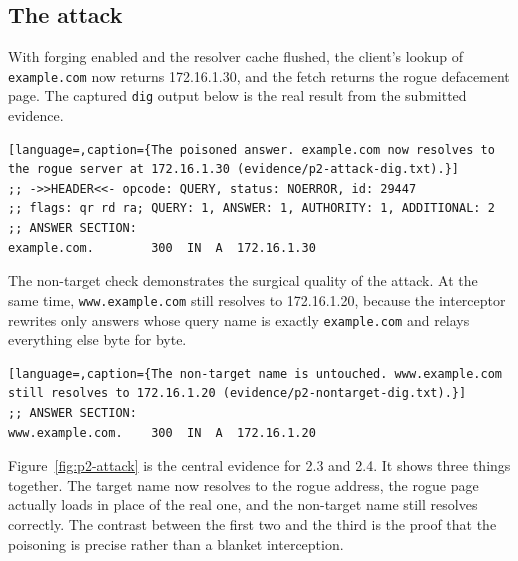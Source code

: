 \documentclass[11pt]{article}
\begin{document}
\subsection{The attack}

With forging enabled and the resolver cache flushed, the client's lookup of
\texttt{example.com} now returns 172.16.1.30, and the fetch returns the rogue
defacement page. The captured \texttt{dig} output below is the real result from
the submitted evidence.

\begin{lstlisting}[language=,caption={The poisoned answer. example.com now resolves to the rogue server at 172.16.1.30 (evidence/p2-attack-dig.txt).}]
;; ->>HEADER<<- opcode: QUERY, status: NOERROR, id: 29447
;; flags: qr rd ra; QUERY: 1, ANSWER: 1, AUTHORITY: 1, ADDITIONAL: 2
;; ANSWER SECTION:
example.com.        300  IN  A  172.16.1.30
\end{lstlisting}

The non-target check demonstrates the surgical quality of the attack. At the same
time, \texttt{www.example.com} still resolves to 172.16.1.20, because the
interceptor rewrites only answers whose query name is exactly \texttt{example.com}
and relays everything else byte for byte.

\begin{lstlisting}[language=,caption={The non-target name is untouched. www.example.com still resolves to 172.16.1.20 (evidence/p2-nontarget-dig.txt).}]
;; ANSWER SECTION:
www.example.com.    300  IN  A  172.16.1.20
\end{lstlisting}


Figure~\ref{fig:p2-attack} is the central evidence for 2.3 and
2.4. It shows three things together. The target name now resolves to the
rogue address, the rogue page actually loads in place of the real one, and the
non-target name still resolves correctly. The contrast between the first two and
the third is the proof that the poisoning is precise rather than a blanket
interception.

\end{document}
